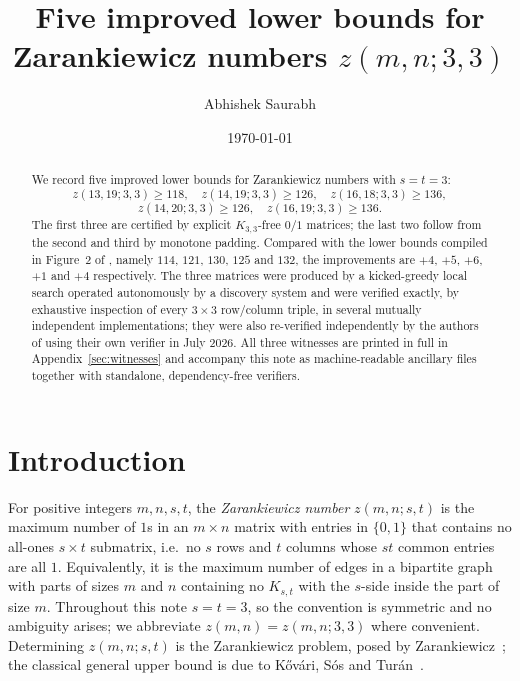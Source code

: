 \documentclass[11pt,reqno]{amsart}
\theoremstyle{plain}
\theoremstyle{remark}
\newcommand{\zz}{z}
\begin{document}
\title[Five improved lower bounds for $\zz(m,n;3,3)$]
      {Five improved lower bounds for Zarankiewicz numbers $\zz(m,n;3,3)$}

\author{Abhishek Saurabh}
\address{Independent researcher}

\date{\today}


\begin{abstract}
We record five improved lower bounds for Zarankiewicz numbers with $s=t=3$:
\[
  \zz(13,19;3,3)\ge 118,\quad
  \zz(14,19;3,3)\ge 126,\quad
  \zz(16,18;3,3)\ge 136,
\]
\[
  \zz(14,20;3,3)\ge 126,\quad
  \zz(16,19;3,3)\ge 136 .
\]
The first three are certified by explicit $K_{3,3}$-free $0/1$ matrices; the last two follow from the
second and third by monotone padding. Compared with the lower bounds compiled in Figure~2 of
\cite{BNL}, namely $114$, $121$, $130$, $125$ and $132$, the improvements are $+4$, $+5$, $+6$, $+1$
and $+4$ respectively. The three matrices were produced by a kicked-greedy local search operated
autonomously by a discovery system and were verified exactly, by exhaustive inspection of every
$3\times3$ row/column triple, in several mutually independent implementations; they were also
re-verified independently by the authors of \cite{BNL} using their own verifier in July 2026. All three
witnesses are printed in full in Appendix~\ref{sec:witnesses} and accompany this note as
machine-readable ancillary files together with standalone, dependency-free verifiers.
\end{abstract}

\maketitle

\section{Introduction}

For positive integers $m,n,s,t$, the \emph{Zarankiewicz number} $\zz(m,n;s,t)$ is the maximum number
of $1$s in an $m\times n$ matrix with entries in $\{0,1\}$ that contains no all-ones $s\times t$
submatrix, i.e.\ no $s$ rows and $t$ columns whose $st$ common entries are all $1$. Equivalently, it
is the maximum number of edges in a bipartite graph with parts of sizes $m$ and $n$ containing no
$K_{s,t}$ with the $s$-side inside the part of size $m$. Throughout this note $s=t=3$, so the
convention is symmetric and no ambiguity arises; we abbreviate $\zz(m,n)=\zz(m,n;3,3)$ where
convenient. Determining $\zz(m,n;s,t)$ is the Zarankiewicz problem, posed by
Zarankiewicz~\cite{Zar51}; the classical general upper bound is due to K\H{o}v\'ari, S\'os and
Tur\'an~\cite{KST54}.
\end{document}
